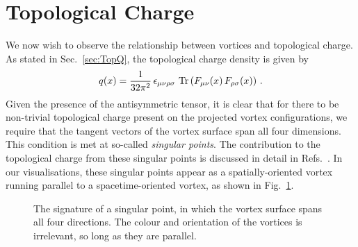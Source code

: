 \section{Topological Charge}\label{sec:TopChargeVis}
We now wish to observe the relationship between vortices and topological charge. As stated in Sec.~\ref{sec:TopQ}, the topological charge density is given by
%
\begin{equation}
q ( x ) = \frac { 1 } { 32 \pi ^ { 2 } } \, \epsilon _ { \mu \nu \rho \sigma } \, \operatorname{Tr}\left( F _ { \mu \nu }( x ) \, F _ { \rho \sigma }(x) \right) \, .
\end{equation}
%
Given the presence of the antisymmetric tensor, it is clear that for there to be non-trivial topological charge present on the projected vortex configurations, we require that the tangent vectors of the vortex surface span all four dimensions. This condition is met at so-called \textit{singular points}. The contribution to the topological charge from these singular points is discussed in detail in Refs.~\cite{Bruckmann:2003yd,Engelhardt:2010ft,Engelhardt:2000wc,Engelhardt:1999xw}. In our visualisations, these singular points appear as a spatially-oriented vortex running parallel to a spacetime-oriented vortex, as shown in Fig.~\ref{fig:SingularPoint}.\\
%
\begin{figure}[H]
\centering
\scalebox{0.85}{}
\caption[The signature of a singular point at the origin. Here the vortex surface spans all four directions.]{\label{fig:SingularPoint} The signature of a singular point, in which the vortex surface spans all four directions. The colour and orientation of the vortices is irrelevant, so long as they are parallel.}
\end{figure}
%

